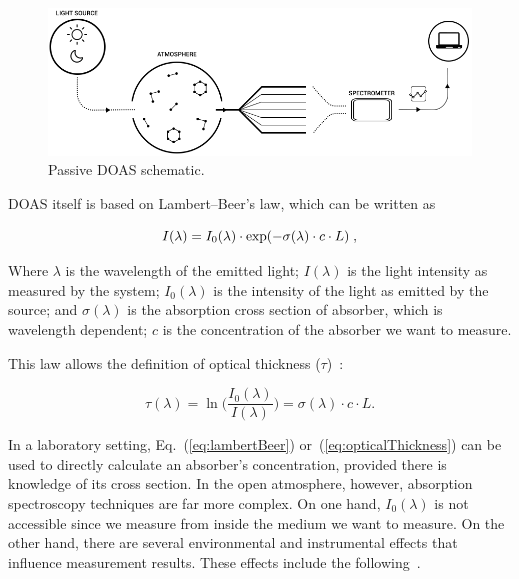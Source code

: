   \begin{figure}[t]
      \includegraphics[width=14cm]{img/png/amt-2016-314-f03.png}
      \caption{Passive DOAS schematic.}\label{fig:passiveSchematic}
  \end{figure}

DOAS itself is based on Lambert--Beer's law, which can be written as
\cite{Platt2007}

\begin{equation}
  \centering
  \label{eq:lambertBeer}
  I(\lambda) = I_0 (\lambda) \cdot \exp(-\sigma(\lambda) \cdot c \cdot L) \;,
\end{equation}

Where $\lambda$ is the wavelength of the emitted light; $I(\lambda)$ is
the light intensity as measured by the system; $I_{0}(\lambda)$ is the
intensity of the light as emitted by the source; and $\sigma(\lambda)$
is the absorption cross section of absorber, which is wavelength
dependent; $c$ is the concentration of the absorber we want to measure.


This law allows the definition of optical thickness
($\tau$)~\cite{Platt2007}:

\begin{equation}
      \label{eq:opticalThickness}
      \tau(\lambda) = \ln \bigg( \frac{I_{0}(\lambda)}{I(\lambda)}\bigg) = \sigma(\lambda) \cdot c \cdot
      L.
\end{equation}

In a laboratory setting, Eq.~(\ref{eq:lambertBeer})
or~(\ref{eq:opticalThickness}) can be used to directly calculate an
absorber's concentration, provided there is knowledge of  its cross
section. In the open atmosphere, however, absorption spectroscopy
techniques are far more complex. On one hand, $I_0(\lambda)$ is not
accessible since we measure from inside the medium we want to measure.
On the other hand, there are several environmental and instrumental
effects that influence measurement results. These effects include the
following~\cite{Platt2007}.


